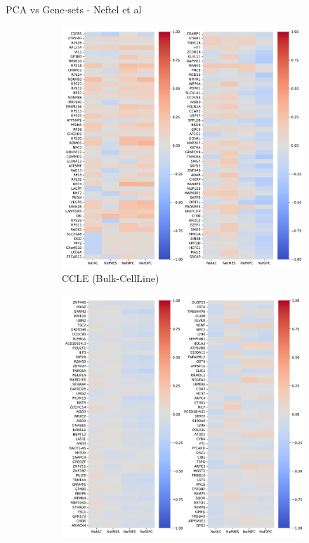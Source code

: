 \documentclass[aspectratio=169,9pt]{beamer}
\begin{document}
    \begin{frame}{PCA vs Gene-sets - Neftel et al}
        \begin{adjustwidth}{-5cm}{-5cm}
            \centering
            \begin{figure}
                \centering
                \begin{subfigure}[c]{0.48\textwidth}
                    \centering
                    \includegraphics[width=\textwidth]{CCLE_load-corr_Nef}
                    \caption{CCLE (Bulk-CellLine)}
                \end{subfigure}
                \begin{subfigure}[c]{0.48\textwidth}
                    \centering
                    \includegraphics[width=\textwidth]{TCGA_load-corr_Nef}

\end{subfigure}
\end{figure}
\end{adjustwidth}
\end{frame}
\end{document}
